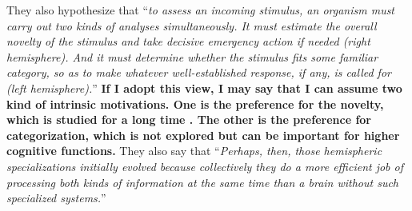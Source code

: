 \documentclass[12pt]{article}
\begin{document}
They also hypothesize that ``\textit{to assess an incoming stimulus, an organism must carry out two kinds of analyses simultaneously. 
It must estimate the overall novelty of the stimulus and take decisive emergency action
if needed (right hemisphere). And it must determine whether the stimulus fits some familiar category, 
so as to make whatever well-established response, if any, is called for (left hemisphere).}'' 
\textbf{If I adopt this view, I may say that I can assume two kind of intrinsic motivations. 
One is the preference for the novelty, which is studied for a long time \cite{Schmidhuber10}. 
The other is the preference for categorization, which is not explored but can be important for 
higher cognitive functions.} They also say that ``\textit{Perhaps, then, those hemispheric specializations 
initially evolved because collectively they do a more efficient job of processing both kinds
of information at the same time than a brain without such specialized systems.}'' 





\end{document}
